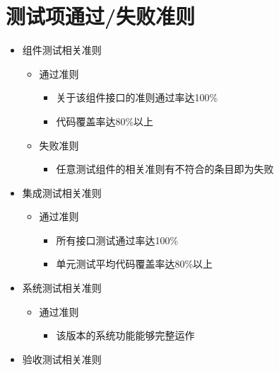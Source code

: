 \documentclass[hyperref, a4paper]{ctexart}
\providecommand{\tightlist}{%
  \setlength{\itemsep}{0pt}\setlength{\parskip}{0pt}}
\begin{document}
\hypertarget{ux6d4bux8bd5ux9879ux901aux8fc7ux5931ux8d25ux51c6ux5219}{%
\section{测试项通过/失败准则}\label{ux6d4bux8bd5ux9879ux901aux8fc7ux5931ux8d25ux51c6ux5219}}

\begin{itemize}
\tightlist
\item
  组件测试相关准则

  \begin{itemize}
  \tightlist
  \item
    通过准则

    \begin{itemize}
    \tightlist
    \item
      关于该组件接口的准则通过率达100\%
    \item
      代码覆盖率达80\%以上
    \end{itemize}
  \item
    失败准则

    \begin{itemize}
    \tightlist
    \item
      任意测试组件的相关准则有不符合的条目即为失败
    \end{itemize}
  \end{itemize}
\item
  集成测试相关准则

  \begin{itemize}
  \tightlist
  \item
    通过准则

    \begin{itemize}
    \tightlist
    \item
      所有接口测试通过率达100\%
    \item
      单元测试平均代码覆盖率达80\%以上
    \end{itemize}
  \end{itemize}
\item
  系统测试相关准则

  \begin{itemize}
  \tightlist
  \item
    通过准则

    \begin{itemize}
    \tightlist
    \item
      该版本的系统功能能够完整运作
    \end{itemize}
  \end{itemize}
\item
  验收测试相关准则


\end{itemize}
\end{document}
